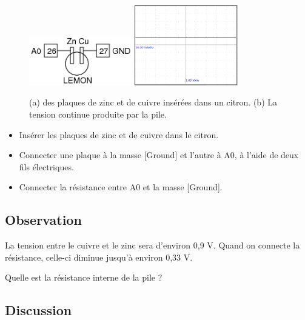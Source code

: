 \documentclass{book}
\begin{document}
\begin{figure}[h!]
\begin{center}
\caption{\label{fig:lemoncell}(a) des plaques de zinc et de cuivre insérées dans un citron. (b) La tension continue produite par la pile. }\vspace{0.5em}
\includegraphics[width=0.4\textwidth, height=0.3\textwidth, keepaspectratio]{Schematic-lemon-cell.png}
\includegraphics[width=0.4\textwidth, height=0.3\textwidth, keepaspectratio]{Pic-lemoncellDC.png}
\end{center}
\end{figure}



\begin{itemize}
  \item Insérer les plaques de zinc et de cuivre dans le citron.
  \item Connecter une plaque à la masse [Ground] et l'autre à A0, à l'aide de deux fils électriques.
  \item Connecter la résistance entre A0 et la masse [Ground].
\end{itemize}

\subsection{Observation}


La tension entre le cuivre et le zinc sera d'environ 0,9 V. Quand on connecte la résistance, celle-ci diminue jusqu'à environ 0,33 V.



Quelle est la résistance interne de la pile ?

\subsection{Discussion}
\end{document}
